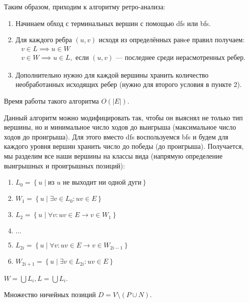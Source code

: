 Таким образом, приходим к алгоритму ретро-анализа:
\begin{enumerate}
  \item Начинаем обход с терминальных вершин с помощью dfs или bfs.
  \item Для каждого ребра $(u, v)$ исходя из определённых ранeе правил получаем:
    \begin{gather*}
      v \in L  \implies u \in W \\   
      v \in W \implies u \in L, \text{ если $(u,v)$ --- последнее среди нерасмотренных ребер.}
    \end{gather*}
  \item Дополнительно нужно для каждой вершины хранить количество необработанных исходящих ребер
    (нужно для второго условия в пункте 2).
\end{enumerate}

\begin{remark}
  Время работы такого алгоритма $O(\left| E \right|)$.
\end{remark}

Данный алгоритм можно модифицировать так, чтобы он выяснял не только тип вершины, но и минимальное число
ходов до выигрыша (максимальное число ходов до проигрыша). Для этого вместо dfs воспользуемся bfs и будем
для каждого уровня вершин хранить число до победы (до проигрыша). Получается, мы разделим все наши
вершины на классы вида (напрямую определение выигрышных и проигрышных позиций):
\begin{enumerate}
  \item $L_0 = \left\{ u \mid \text{из $u$ не выходит ни одной дуги} \right\} $ 
  \item $W_1 = \left\{ u \mid \exists v \in L_0 \colon uv \in E \right\} $
  \item $L_2 = \left\{ u \mid \forall v \colon uv \in E \to v \in W_1 \right\} $
  \item $\ldots$ 
  \item $L_{2i} = \left\{ u \mid \forall v \colon uv \in E \to v \in W_{2i - 1} \right\} $
  \item $W_{2i+1} = \left\{ u \mid \exists v \in L_{2i} \colon uv \in E \right\} $
\end{enumerate}

\begin{remark}
  $W = \bigcup L_{i}, L = \bigcup L_{i}$.
\end{remark}

\begin{remark}
  Множество ничейных позиций $D = V \setminus (P \cup N)$.
\end{remark}












